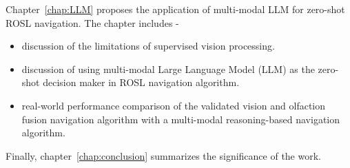 Chapter~\ref{chap:LLM} proposes the application of multi-modal LLM for zero-shot ROSL navigation. The chapter includes -
\begin{itemize}
    \item discussion of the limitations of supervised vision processing.
    \item discussion of using multi-modal Large Language Model (LLM) as the zero-shot decision maker in ROSL navigation algorithm.
    \item real-world performance comparison of the validated vision and olfaction fusion navigation algorithm with a multi-modal reasoning-based navigation algorithm.
\end{itemize}

Finally, chapter~\ref{chap:conclusion} summarizes the significance of the work.

